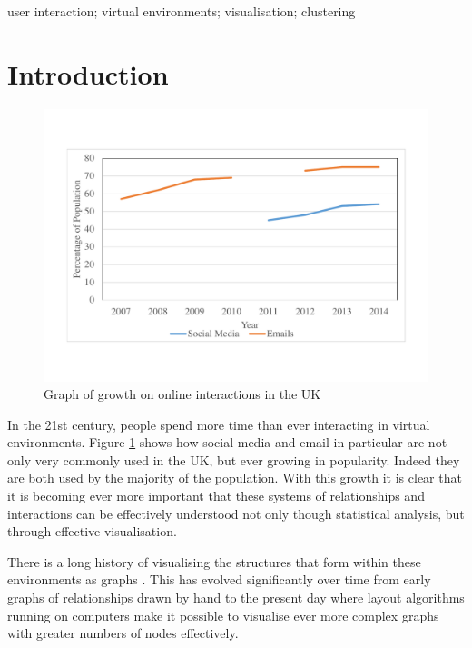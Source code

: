 \documentclass[12pt,a4paper]{article}
\begin{document}
\begin{keywords}
user interaction; virtual environments; visualisation; clustering
\end{keywords}

\section{Introduction}

\begin{figure}[htb]
\centering
\caption{Graph of growth on online interactions in the UK \protect\cite{ons}}
\label{fig:interactions}
\includegraphics[scale=0.4]{Chart.pdf}
\end{figure}

\noindent   
In the 21st century, people spend more time than ever interacting in virtual environments. Figure \ref{fig:interactions} shows how social media and email in particular are not only very commonly used in the UK, but ever growing in popularity. Indeed they are both used by the majority of the population. With this growth it is clear that it is becoming ever more important that these systems of relationships and interactions can be effectively understood not only though statistical analysis, but through effective visualisation.

There is a long history of visualising the structures that form within these environments as graphs \cite{freeman2000visualizing}. This has evolved significantly over time from early graphs of relationships drawn by hand to the present day where layout algorithms running on computers make it possible to visualise ever more complex graphs with greater numbers of nodes effectively. 
\end{document}

